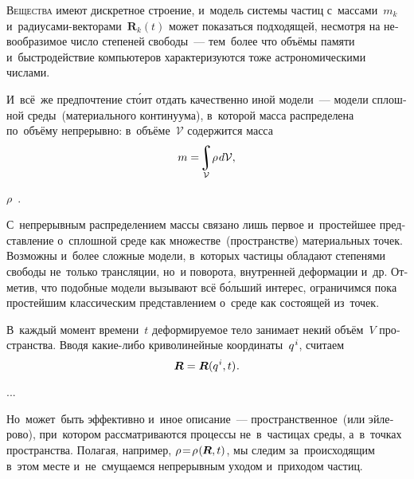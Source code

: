 \begin{otherlanguage}{russian}

\lettrine[lines=2, findent=2pt, nindent=0pt]{В}{ещества} имеют дискретное строение, и~модель системы частиц с~массами~${m_k}$ и~радиусами\hbox{-}векторами~${\bm{R}_k (t)}$ может показаться подходящей, несмотря на невообразимое число степеней свободы~--- тем~более что объёмы памяти и~быстродействие компьютеров характеризуются тоже астрономическими числами.

И~всё~же предпочтение ст\'{о}ит отдать качественно иной модели~--- модели сплошной среды~(материального континуума), в~которой масса распределена по~объёму непрерывно: в~объёме~$\mathcal{V}$ содержится масса
\vspace{-0.25em}\begin{equation}
m =\! \integral\displaylimits_{\mathcal{V}} \! \rho \hspace{0.2ex} d\mathcal{V},
\end{equation}

\vspace{-0.5em}\noindent {} $\rho$~.

С~непрерывным распределением массы связано лишь первое и~простейшее представление о~сплошной среде как множестве~(пространстве) материальных точек. Возможны и~более сложные модели, в~которых частицы обладают степенями свободы не~только трансляции, но~и поворота, внутренней деформации и~др. Отметив, что подобные модели вызывают всё б\'{о}льший интерес, ограничимся пока простейшим классическим представлением о~среде как состоящей из~точек.

В~каждый момент времени~$t$ деформируемое тело занимает некий объём~$V$ пространства. Вводя какие\hbox{-}либо криволинейные координаты~${q^{\hspace{.1ex}i}}$, считаем
\begin{equation}
\bm{R} = \bm{R}(q^{\hspace{.1ex}i}, t) \hspace{.1ex}.
\end{equation}

...


Но~может~быть эффективно и~иное описание~--- пространственное~(или эйлерово), при~котором рассматриваются процессы не~в~частицах среды, а~в~точках пространства. Полагая, например, ${\rho \!=\! \rho \hspace{.16ex} (\hspace{-0.1ex}\bm{R}, t)}$, мы следим за~происходящим в~этом месте и~не~смущаемся непрерывным уходом и~приходом частиц.


\end{otherlanguage}
